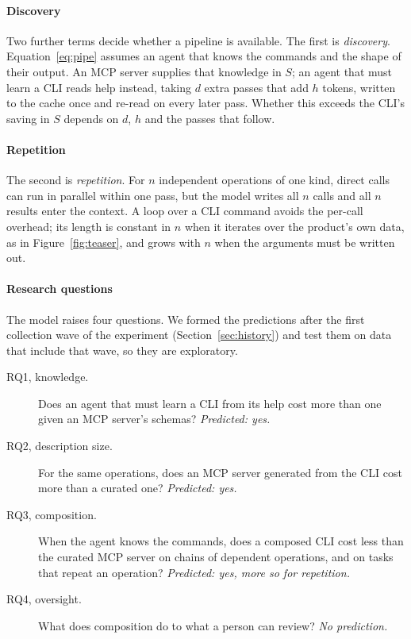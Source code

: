 \documentclass[sigconf,nonacm]{acmart}
\begin{document}
\paragraph{Discovery}
Two further terms decide whether a pipeline is available. The first is \emph{discovery}. Equation~\ref{eq:pipe} assumes an agent that knows the commands and the shape of their output. An MCP server supplies that knowledge in $S$; an agent that must learn a CLI reads help instead, taking $d$ extra passes that add $h$ tokens, written to the cache once and re-read on every later pass. Whether this exceeds the CLI's saving in $S$ depends on $d$, $h$ and the passes that follow.

\paragraph{Repetition}
The second is \emph{repetition}. For $n$ independent operations of one kind, direct calls can run in parallel within one pass, but the model writes all $n$ calls and all $n$ results enter the context. A loop over a CLI command avoids the per-call overhead; its length is constant in $n$ when it iterates over the product's own data, as in Figure~\ref{fig:teaser}, and grows with $n$ when the arguments must be written out.

\paragraph{Research questions}
\label{sec:hypotheses}
The model raises four questions. We formed the predictions after the first collection wave of the experiment (Section~\ref{sec:history}) and test them on data that include that wave, so they are exploratory.
\begin{description}
\item[RQ1, knowledge.] Does an agent that must learn a CLI from its help cost more than one given an MCP server's schemas? \emph{Predicted: yes.}
\item[RQ2, description size.] For the same operations, does an MCP server generated from the CLI cost more than a curated one? \emph{Predicted: yes.}
\item[RQ3, composition.] When the agent knows the commands, does a composed CLI cost less than the curated MCP server on chains of dependent operations, and on tasks that repeat an operation? \emph{Predicted: yes, more so for repetition.}
\item[RQ4, oversight.] What does composition do to what a person can review? \emph{No prediction.}
\end{description}
\end{document}
